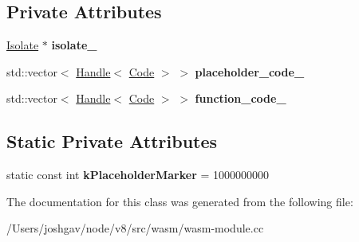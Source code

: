 \subsection*{Private Attributes}
\begin{DoxyCompactItemize}
\item 
\hyperlink{classv8_1_1internal_1_1_isolate}{Isolate} $\ast$ {\bfseries isolate\+\_\+}\hypertarget{classv8_1_1internal_1_1wasm_1_1_wasm_linker_a9eb2ce1df5ebd1e2fc035539e09ec246}{}\label{classv8_1_1internal_1_1wasm_1_1_wasm_linker_a9eb2ce1df5ebd1e2fc035539e09ec246}

\item 
std\+::vector$<$ \hyperlink{classv8_1_1internal_1_1_handle}{Handle}$<$ \hyperlink{classv8_1_1internal_1_1_code}{Code} $>$ $>$ {\bfseries placeholder\+\_\+code\+\_\+}\hypertarget{classv8_1_1internal_1_1wasm_1_1_wasm_linker_a36f668f69118e0e02aae4a75b665d64c}{}\label{classv8_1_1internal_1_1wasm_1_1_wasm_linker_a36f668f69118e0e02aae4a75b665d64c}

\item 
std\+::vector$<$ \hyperlink{classv8_1_1internal_1_1_handle}{Handle}$<$ \hyperlink{classv8_1_1internal_1_1_code}{Code} $>$ $>$ {\bfseries function\+\_\+code\+\_\+}\hypertarget{classv8_1_1internal_1_1wasm_1_1_wasm_linker_a40065c2b4ed0634bbcc4683cee81b4c5}{}\label{classv8_1_1internal_1_1wasm_1_1_wasm_linker_a40065c2b4ed0634bbcc4683cee81b4c5}

\end{DoxyCompactItemize}
\subsection*{Static Private Attributes}
\begin{DoxyCompactItemize}
\item 
static const int {\bfseries k\+Placeholder\+Marker} = 1000000000\hypertarget{classv8_1_1internal_1_1wasm_1_1_wasm_linker_aacccea746d163f414e1ed88c51d8d03b}{}\label{classv8_1_1internal_1_1wasm_1_1_wasm_linker_aacccea746d163f414e1ed88c51d8d03b}

\end{DoxyCompactItemize}


The documentation for this class was generated from the following file\+:\begin{DoxyCompactItemize}
\item 
/\+Users/joshgav/node/v8/src/wasm/wasm-\/module.\+cc\end{DoxyCompactItemize}

